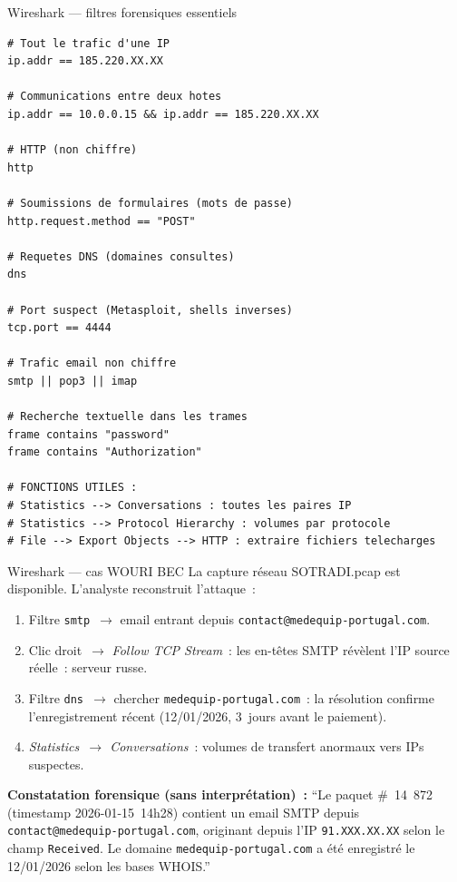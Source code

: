 \begin{boxoutils}{Wireshark --- filtres forensiques essentiels}
\begin{lstlisting}[language=bash_forensique]
# Tout le trafic d'une IP
ip.addr == 185.220.XX.XX

# Communications entre deux hotes
ip.addr == 10.0.0.15 && ip.addr == 185.220.XX.XX

# HTTP (non chiffre)
http

# Soumissions de formulaires (mots de passe)
http.request.method == "POST"

# Requetes DNS (domaines consultes)
dns

# Port suspect (Metasploit, shells inverses)
tcp.port == 4444

# Trafic email non chiffre
smtp || pop3 || imap

# Recherche textuelle dans les trames
frame contains "password"
frame contains "Authorization"

# FONCTIONS UTILES :
# Statistics --> Conversations : toutes les paires IP
# Statistics --> Protocol Hierarchy : volumes par protocole
# File --> Export Objects --> HTTP : extraire fichiers telecharges
\end{lstlisting}
\end{boxoutils}

\begin{boxscenario}{Wireshark --- cas WOURI BEC}
La capture réseau SOTRADI.pcap est disponible. L'analyste reconstruit
l'attaque~:
\begin{enumerate}
    \item Filtre \texttt{smtp}~$\to$ email entrant depuis
          \texttt{contact@medequip-portugal.com}.
    \item Clic droit~$\to$ \textit{Follow TCP Stream}~: les en-têtes
          SMTP révèlent l'IP source réelle~: serveur russe.
    \item Filtre \texttt{dns}~$\to$ chercher \texttt{medequip-portugal.com}~:
          la résolution confirme l'enregistrement récent (12/01/2026,
          3~jours avant le paiement).
    \item \textit{Statistics~$\to$ Conversations}~: volumes de transfert
          anormaux vers IPs suspectes.
\end{enumerate}

\textbf{Constatation forensique (sans interprétation)~:} ``Le paquet
\#~14~872 (timestamp 2026-01-15~14h28) contient un email SMTP depuis
\texttt{contact@medequip-portugal.com}, originant depuis l'IP
\texttt{91.XXX.XX.XX} selon le champ \texttt{Received}. Le domaine
\texttt{medequip-portugal.com} a été enregistré le 12/01/2026 selon
les bases WHOIS.''
\end{boxscenario}

